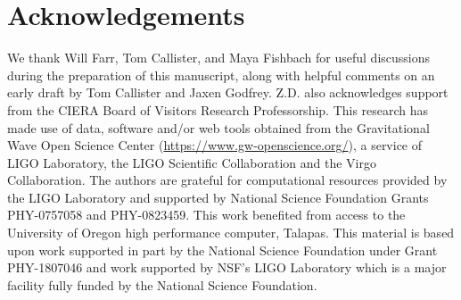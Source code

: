 \documentclass[twocolumn, linenumbers]{aastex631}
\begin{document}
\section{Acknowledgements}\label{sec:acknowledments}
We thank Will Farr, Tom Callister, and Maya Fishbach for useful discussions during the preparation of this manuscript, 
along with helpful comments on an early draft by Tom Callister and Jaxen Godfrey. Z.D. also acknowledges support from the CIERA Board
of Visitors Research Professorship. This research has made use of data, software and/or web tools obtained from the Gravitational Wave Open Science Center 
(\url{https://www.gw-openscience.org/}), a service of LIGO Laboratory, the LIGO Scientific Collaboration and the Virgo Collaboration. 
The authors are grateful for computational resources provided by the LIGO Laboratory and supported by National Science Foundation Grants PHY-0757058 and PHY-0823459.  
This work benefited from access to the University of Oregon high performance computer, Talapas. This material is based upon work supported 
in part by the National Science Foundation under Grant PHY-1807046 and work supported by NSF's LIGO Laboratory which is a major facility 
fully funded by the National Science Foundation.
{}



\end{document}
